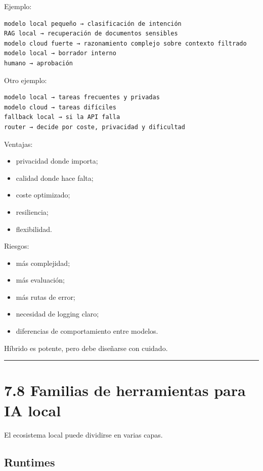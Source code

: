Ejemplo:

\begin{lstlisting}
modelo local pequeño → clasificación de intención
RAG local → recuperación de documentos sensibles
modelo cloud fuerte → razonamiento complejo sobre contexto filtrado
modelo local → borrador interno
humano → aprobación
\end{lstlisting}

Otro ejemplo:

\begin{lstlisting}
modelo local → tareas frecuentes y privadas
modelo cloud → tareas difíciles
fallback local → si la API falla
router → decide por coste, privacidad y dificultad
\end{lstlisting}

Ventajas:

\begin{itemize}
\tightlist
\item
  privacidad donde importa;
\item
  calidad donde hace falta;
\item
  coste optimizado;
\item
  resiliencia;
\item
  flexibilidad.
\end{itemize}

Riesgos:

\begin{itemize}
\tightlist
\item
  más complejidad;
\item
  más evaluación;
\item
  más rutas de error;
\item
  necesidad de logging claro;
\item
  diferencias de comportamiento entre modelos.
\end{itemize}

Híbrido es potente, pero debe diseñarse con cuidado.

\begin{center}\rule{0.5\linewidth}{0.5pt}\end{center}

\section{7.8 Familias de herramientas para IA
local}\label{familias-de-herramientas-para-ia-local}

El ecosistema local puede dividirse en varias capas.

\subsection{Runtimes}\label{runtimes}

